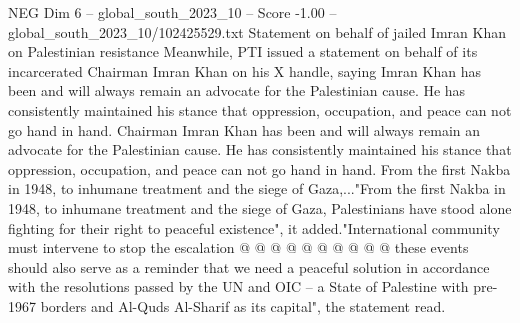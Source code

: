 \begin{textsample}{NEG Dim 6 – global\_south\_2023\_10 – Score -1.00 – global\_south\_2023\_10/102425529.txt}
Statement on behalf of jailed Imran Khan on Palestinian resistance Meanwhile, PTI issued a statement on behalf of its incarcerated Chairman Imran Khan on his X handle, saying Imran Khan has been and will always remain an advocate for the Palestinian cause.
He has consistently maintained his stance that oppression, occupation, and peace can not go hand in hand.
Chairman Imran Khan has been and will always remain an advocate for the Palestinian cause.
He has consistently maintained his stance that oppression, occupation, and peace can not go hand in hand.
From the first Nakba in 1948, to inhumane treatment and the siege of Gaza,..."From the first Nakba in 1948, to inhumane treatment and the siege of Gaza, Palestinians have stood alone fighting for their right to peaceful existence", it added."International community must intervene to stop the escalation @ @ @ @ @ @ @ @ @ @ these events should also serve as a reminder that we need a peaceful solution in accordance with the resolutions passed by the UN and OIC -- a State of Palestine with pre-1967 borders and Al-Quds Al-Sharif as its capital", the statement read.

\end{textsample}
